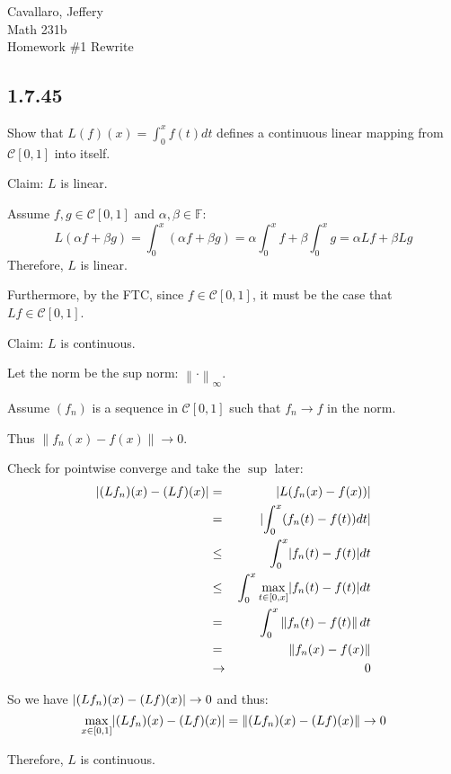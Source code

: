 \documentclass[letterpaper,12pt,fleqn]{article}
\newcommand{\mc}{\mathcal{C}}
\newcommand{\norm}[1]{\left\|#1\right\|}
\newcommand{\F}{\mathbb{F}}
\renewcommand{\a}{\alpha}
\renewcommand{\b}{\beta}
\begin{document}
Cavallaro, Jeffery \\
Math 231b \\
Homework \#1 Rewrite
\subsection*{1.7.45}

Show that $L(f)(x)=\int_0^xf(t)dt$ defines a continuous linear mapping from
$\mc[0,1]$ into itself.

Claim: $L$ is linear.

Assume $f,g\in\mc[0,1]$ and $\a,\b\in\F$:
\[L(\a f+\b g)=\int_0^x(\a f+\b g)=\a\int_0^xf+\b\int_0^xg=\a Lf+\b Lg\]
Therefore, $L$ is linear.

Furthermore, by the FTC, since $f\in\mc[0,1]$, it must be the case that
$Lf\in\mc[0,1]$.

Claim: $L$ is continuous.

Let the norm be the sup norm: $\norm{\cdot}_{\infty}$.

Assume $(f_n)$ is a sequence in $\mc[0,1]$ such that $f_n\to f$ in the norm.

Thus $\norm{f_n(x)-f(x)}\to0$.

Check for pointwise converge and take the $\sup$ later:
\begin{eqnarray*}
  \abs{(Lf_n)(x)-(Lf)(x)} &=& \abs{L(f_n(x)-f(x))} \\
  &=& \abs{\int_0^x(f_n(t)-f(t))dt} \\
  &\le& \int_0^x\abs{f_n(t)-f(t)}dt \\
  &\le& \int_0^x\max_{t\in[0,x]}\abs{f_n(t)-f(t)}dt \\
  &=& \int_0^x\norm{f_n(t)-f(t)}dt \\
  &=& \norm{f_n(x)-f(x)} \\
  &\to& 0
\end{eqnarray*}

So we have $\lvert(Lf_n)(x)-(Lf)(x)\rvert\to0$ and thus:
\[\max_{x\in[0,1]}\abs{(Lf_n)(x)-(Lf)(x)}=\norm{(Lf_n)(x)-(Lf)(x)}\to0\]

Therefore, $L$ is continuous.
\end{document}
